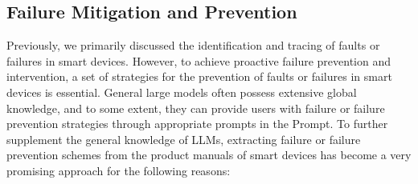 \documentclass[preprint,12pt]{elsarticle}
\begin{document}
\subsection{Failure Mitigation and Prevention}

Previously, we primarily discussed the identification and tracing of faults or failures in smart devices. However, to achieve proactive failure prevention and intervention, a set of strategies for the prevention of faults or failures in smart devices is essential. General large models often possess extensive global knowledge, and to some extent, they can provide users with failure or failure prevention strategies through appropriate prompts in the Prompt. To further supplement the general knowledge of LLMs, extracting failure or failure prevention schemes from the product manuals of smart devices has become a very promising approach for the following reasons:
\end{document}
